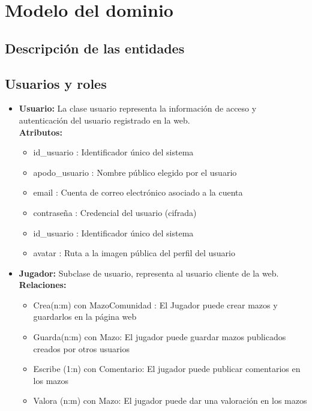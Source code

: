 \documentclass[10pt]{article}
\begin{document}
	\newpage
	\section{Modelo del dominio}
	\subsection*{Descripción de las entidades}
	\subsection{Usuarios y roles}
		\begin{itemize}
			\item \textbf{Usuario:} La clase usuario representa la información de acceso y autenticación del usuario registrado en la web.\\
			\textbf{Atributos:}
			\begin{itemize}
				\item id\_usuario : Identificador único del sistema
				\item apodo\_usuario : Nombre público elegido por el usuario
				\item email : Cuenta de correo electrónico asociado a la cuenta
				\item contraseña : Credencial del usuario (cifrada)
				\item id\_usuario : Identificador único del sistema
				\item avatar : Ruta a la imagen pública del perfil del usuario
			\end{itemize}
			
			\item \textbf{Jugador:} Subclase de usuario, representa al usuario cliente de la web.\\
			\textbf{Relaciones:}
			\begin{itemize}
				\item Crea(n:m) con MazoComunidad : El Jugador puede crear mazos y guardarlos en la página web
				\item Guarda(n:m) con Mazo: El jugador puede guardar mazos publicados creados por otros usuarios
				\item Escribe (1:n) con Comentario: El jugador puede publicar comentarios en los mazos
				\item Valora (n:m) con Mazo: El jugador puede dar una valoración en los mazos 
			\end{itemize}
			

\end{itemize}
\end{document}

